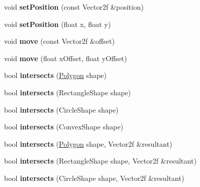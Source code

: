 \begin{DoxyCompactItemize}
\mbox{\label{class_polygon_a79db7b74993e7c419e1e3243a6b2e4e2}} 
void {\bfseries set\+Position} (const Vector2f \&position)
\item 
\mbox{\label{class_polygon_a59fc0fa86f807dc3921bae20739fdbb1}} 
void {\bfseries set\+Position} (float x, float y)
\item 
\mbox{\label{class_polygon_a21dc29d3c6dfa6d59a4f62dc0b135e50}} 
void {\bfseries move} (const Vector2f \&offset)
\item 
\mbox{\label{class_polygon_ab809ff31ab4a7ec2ebe6e5b3ef2217c5}} 
void {\bfseries move} (float x\+Offset, float y\+Offset)
\item 
\mbox{\label{class_polygon_a15574e83f243b648b0d70537b41118ae}} 
bool {\bfseries intersects} (\mbox{\hyperlink{class_polygon}{Polygon}} shape)
\item 
\mbox{\label{class_polygon_ad4a0ce3f20094604b01dd96d06257ea1}} 
bool {\bfseries intersects} (Rectangle\+Shape shape)
\item 
\mbox{\label{class_polygon_ad9ce9cb3c6871e75099a261a810bedcc}} 
bool {\bfseries intersects} (Circle\+Shape shape)
\item 
\mbox{\label{class_polygon_a24df2b2ee889cdd07ea91ccaa4810a93}} 
bool {\bfseries intersects} (Convex\+Shape shape)
\item 
\mbox{\label{class_polygon_a713983b426b75523599e862924bca782}} 
bool {\bfseries intersects} (\mbox{\hyperlink{class_polygon}{Polygon}} shape, Vector2f \&resultant)
\item 
\mbox{\label{class_polygon_aa1af5f5482999785aed533d16279c67b}} 
bool {\bfseries intersects} (Rectangle\+Shape shape, Vector2f \&resultant)
\item 
\mbox{\label{class_polygon_a874be1c28a2a1477d1ea5d85ece74822}} 
bool {\bfseries intersects} (Circle\+Shape shape, Vector2f \&resultant)
\item 
\mbox{\label{class_polygon_ab7fb23f4dbf6277688c4fb11f0a5938f}} 

\end{DoxyCompactItemize}
